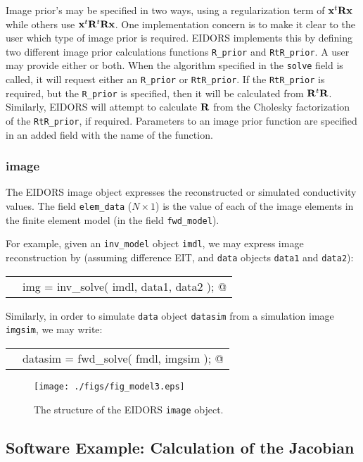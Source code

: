 \documentclass[12pt]{iopart}
\makeatletter
\newcommand{\CODEstart}{\medskip\begin{tabular}{ll}}
\newcommand{\CN}{\tt\scriptsize} %
\newcommand{\CC}{&\small\verb@}   % start code
\newcommand{\CODEend}{\end{tabular}\medskip}
\makeatother
\begin{document}
Image prior's may be specified in two ways, using a 
regularization term of ${\bf x}^t{\bf R}{\bf x}$
while others use ${\bf x}^t{\bf R}^t{\bf R}{\bf x}$.
One implementation concern is to make it clear to the
user which type of image prior is required. EIDORS
implements this by defining two different image prior
calculations functions {\tt R\_prior} and {\tt RtR\_prior}.
A user may provide either or both. When the algorithm
specified in the {\tt solve} field is called, it will request
either an {\tt R\_prior} or {\tt RtR\_prior}. If the 
{\tt RtR\_prior} is required, but the {\tt R\_prior} 
is specified, then it will be calculated from ${\bf R}^t{\bf R}$.
Similarly, EIDORS will attempt to calculate ${\bf R}$ 
from the Cholesky factorization of the {\tt RtR\_prior},
if required. Parameters to an image prior function are
specified in an added field with the name of the function.

\subsubsection{image}

The EIDORS image object expresses the reconstructed or
simulated conductivity values. The field {\tt elem\_data}
($N\times1$) is the value of each of the image elements in 
the finite element model (in the field {\tt fwd\_model}).

For example, given
an {\tt inv\_model} object {\tt imdl}, we may express
image reconstruction by (assuming
difference EIT, and {\tt data} objects {\tt data1} and {\tt data2}):

\CODEstart
\CN    \CC img = inv_solve( imdl, data1, data2 ); @\\[-3pt]
\CODEend

Similarly, in order to simulate {\tt data} object {\tt datasim}
from a simulation image {\tt imgsim}, we may write:

\CODEstart
\CN    \CC datasim = fwd_solve( fmdl, imgsim ); @\\[-3pt]
\CODEend

%
%
\begin{figure}[th]
\begin{flushright}
\texttt{[image: ./figs/fig\_model3.eps]}
\caption{\small The structure of the EIDORS {\tt image} object.
\label{fig:image}
 }
\end{flushright}
\end{figure}


\subsection{Software Example: Calculation of the Jacobian}
\end{document}
